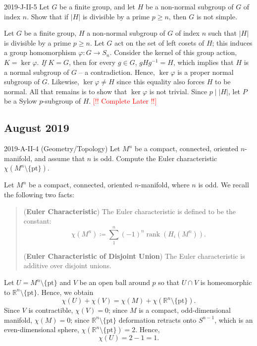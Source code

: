 \documentclass{article}
\begin{document}
\begin{prb}{2019-J-II-5}
	Let $G$ be a finite group, and let $H$ be a non-normal subgroup of $G$ of index $n$. Show that if $|H|$ is divisible by a prime $p \geq n$, then $G$ is not simple. 
\end{prb}
\begin{solutions}
	Let $G$ be a finite group, $H$ a non-normal subgroup of $G$ of index $n$ such that $|H|$ is divisible by a prime $p \geq n$. Let $G$ act on the set of left cosets of $H$; this induces a group homomorphism $\varphi: G \to S_{n}$. Consider the kernel of this group action, $K = \ker{\varphi}$. \textit{If} $K = G$, then for every $g \in G$, $gHg^{-1} = H$, which implies that $H$ is a normal subgroup of $G$ -- a contradiction. Hence, $\ker{\varphi}$ is a proper normal subgroup of $G$. Likewise, $\ker{\varphi} \neq H$ since this equality also forces $H$ to be normal. All that remains is to show that $\ker{\varphi}$ is not trivial. Since $p\mid |H|$, let $P$ be a Sylow $p$-subgroup of $H$. \textcolor{red}{[!! Complete Later !!]}
\end{solutions}


\subsection{August 2019}

\begin{prb}{2019-A-II-4 (Geometry/Topology)}
	Let $M^{n}$ be a compact, connected, oriented $n$-manifold, and assume that $n$ is odd. Compute the Euler characteristic $\chi(M^{n}\setminus\{\text{pt}\})$. 
\end{prb}
\begin{solutions}
	Let $M^{n}$ be a compact, connected, oriented $n$-manifold, where $n$ is odd. We recall the following two facts:
		\begin{quote}
			(\textbf{Euler Characteristic}) The Euler characteristic is defined to be the constant: 
				\begin{equation}
					\chi(M^{n}) \coloneqq \sum_{1}^{n}(-1)^{n}\operatorname{rank}(H_{i}(M^{n})).
				\end{equation}
				
			(\textbf{Euler Characteristic of Disjoint Union}) The Euler characteristic is additive over disjoint unions. 
		\end{quote}
	Let $U = M^{n}\setminus \{\text{pt}\}$ and $V$ be an open ball around $p$ so that $U \cap V$ is homeomorphic to $\mathbb{R}^{n}\setminus \{\text{pt}\}$. Hence, we obtain 
		\begin{equation}
			\chi(U) + \chi(V) = \chi(M) + \chi(\mathbb{R}^{n}\setminus \{\text{pt}\}). 
		\end{equation}
	Since $V$ is contractible, $\chi(V) = 0$; since $M$ is a compact, odd-dimensional manifold, $\chi(M) = 0$; since $\mathbb{R}^{n}\setminus \{\text{pt}\}$ deformation retracts onto $S^{n - 1}$, which is an even-dimensional sphere, $\chi(\mathbb{R}^{n}\setminus \{\text{pt}\}) = 2$. Hence, 
		\begin{equation}
			\chi(U) = 2 - 1= 1. 
		\end{equation}
\end{solutions}
\end{document}
